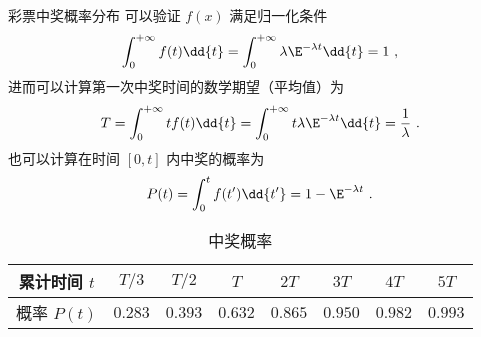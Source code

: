 \begin{example}{彩票中奖概率分布}
可以验证 $f(x)$ 满足归一化条件
\begin{equation}
\int_0^{+\infty} f(t) \dd{t} = \int_0^{+\infty} \lambda\E^{-\lambda t} \dd{t} = 1~,
\end{equation}
进而可以计算第一次中奖时间的数学期望（平均值）为
\begin{equation}
T = \int_0^{+\infty} t f(t) \dd{t} = \int_0^{+\infty}t \lambda\E^{-\lambda t} \dd{t} = \frac{1}{\lambda}~.
\end{equation}
也可以计算在时间 $[0, t]$ 内中奖的概率为
\begin{equation}
P(t) = \int_0^{t} f(t') \dd{t'} = 1 - \E^{-\lambda t}~.
\end{equation}
\begin{table}[ht]
\centering
\caption{中奖概率}\label{tab_RandF_2}
\begin{tabular}{|c|c|c|c|c|c|c|c|}
\hline
累计时间 $t$ & $T/3$  & $T/2$  & $T$     & $2T$ &     $3T$   &  $4T$   & $5T$\\
\hline
概率 $P(t)$ & $0.283$ & $0.393$ & $0.632$ & $0.865$ & $0.950$ & $0.982$ & $0.993$\\
\hline
\end{tabular}
\end{table}
\end{example}
